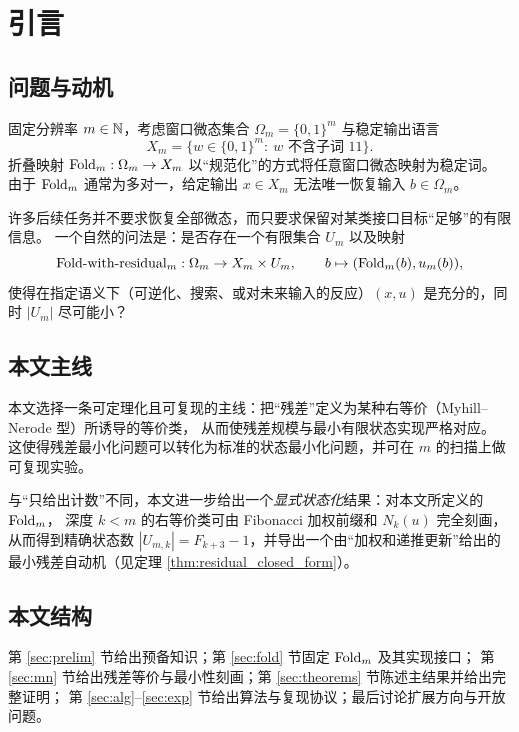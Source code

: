 \section{引言}

\subsection{问题与动机}
固定分辨率 $m\in\mathbb{N}$，考虑窗口微态集合 $\Omega_m=\{0,1\}^m$ 与稳定输出语言
\[
X_m=\{w\in\{0,1\}^m:\ \text{$w$ 不含子词 $11$}\}.
\]
折叠映射 $\mathrm{Fold}_m:\Omega_m\to X_m$ 以“规范化”的方式将任意窗口微态映射为稳定词。
由于 $\mathrm{Fold}_m$ 通常为多对一，给定输出 $x\in X_m$ 无法唯一恢复输入 $b\in\Omega_m$。

许多后续任务并不要求恢复全部微态，而只要求保留对某类接口目标“足够”的有限信息。
一个自然的问法是：是否存在一个有限集合 $U_m$ 以及映射
\[
\mathrm{Fold}\text{-with-residual}_m:\Omega_m\to X_m\times U_m,\qquad
b\mapsto(\mathrm{Fold}_m(b),u_m(b)),
\]
使得在指定语义下（可逆化、搜索、或对未来输入的反应）$(x,u)$ 是充分的，同时 $|U_m|$ 尽可能小？

\subsection{本文主线}
本文选择一条可定理化且可复现的主线：把“残差”定义为某种右等价（Myhill--Nerode 型）所诱导的等价类，
从而使残差规模与最小有限状态实现严格对应。
这使得残差最小化问题可以转化为标准的状态最小化问题，并可在 $m$ 的扫描上做可复现实验。

与“只给出计数”不同，本文进一步给出一个\emph{显式状态化}结果：对本文所定义的 $\mathrm{Fold}_m$，
深度 $k<m$ 的右等价类可由 Fibonacci 加权前缀和 $N_k(u)$ 完全刻画，从而得到精确状态数
$|U_{m,k}|=F_{k+3}-1$，并导出一个由“加权和递推更新”给出的最小残差自动机（见定理 \ref{thm:residual_closed_form}）。

\subsection{本文结构}
第 \ref{sec:prelim} 节给出预备知识；第 \ref{sec:fold} 节固定 $\mathrm{Fold}_m$ 及其实现接口；
第 \ref{sec:mn} 节给出残差等价与最小性刻画；第 \ref{sec:theorems} 节陈述主结果并给出完整证明；
第 \ref{sec:alg}--\ref{sec:exp} 节给出算法与复现协议；最后讨论扩展方向与开放问题。

